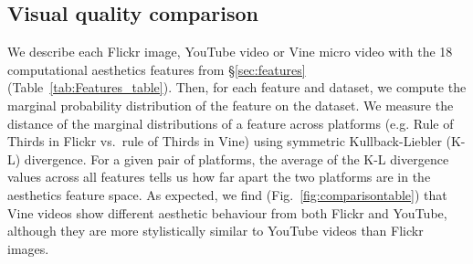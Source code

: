 \subsection{Visual quality comparison} 
We describe each Flickr image, YouTube video or Vine micro video with the 18 computational aesthetics features from \S\ref{sec:features} (Table~\ref{tab:Features_table}). Then, for each feature and dataset, we compute the  marginal probability distribution of the feature on the dataset. %
We measure the distance of the marginal distributions of a feature across platforms  (e.g. Rule of Thirds in Flickr vs.\ rule of Thirds in Vine) using symmetric Kullback-Liebler (K-L) divergence. For a given pair of platforms, the average of the K-L divergence values across all features tells us how far apart the two platforms are in the aesthetics feature space. As expected, we find (Fig.~\ref{fig:comparisontable})  that Vine videos show different aesthetic behaviour from both Flickr and YouTube, although they are more stylistically similar to YouTube videos than Flickr images.


